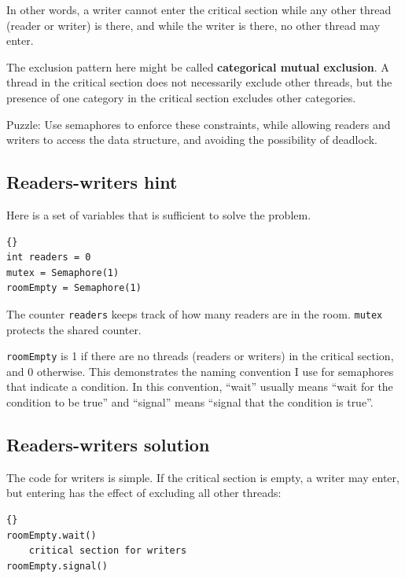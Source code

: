 \documentclass{book}
\begin{document}
In other words, a writer cannot enter the critical section while
any other thread (reader or writer) is there, and while the writer
is there, no other thread may enter.

The exclusion pattern here might be called {\bf categorical
        mutual exclusion}.  A thread in the critical section
does not necessarily exclude other threads, but the presence
of one category in the critical section excludes other
categories.

Puzzle: Use semaphores to enforce these constraints, while allowing
readers and writers to access the data structure, and avoiding
the possibility of deadlock.



\subsection{Readers-writers hint}

Here is a set of variables that is sufficient to solve the
problem.

\newpage
\begin{lstlisting}[title={Readers-writers initialization}]{}
int readers = 0
mutex = Semaphore(1)
roomEmpty = Semaphore(1)
\end{lstlisting}

The counter {\tt readers} keeps track of how many readers
are in the room.  {\tt mutex} protects the shared counter.

    {\tt roomEmpty} is 1 if there are no threads (readers or writers) in
the critical section, and 0 otherwise.  This demonstrates the naming
convention I use for semaphores that indicate a condition.  In
this convention, ``wait'' usually means ``wait for the condition to
be true'' and ``signal'' means ``signal that the condition is true''.



\subsection {Readers-writers solution}

The code for writers is simple.  If the critical section
is empty, a writer may enter, but entering has the effect
of excluding all other threads:

\begin{lstlisting}[title={Writers solution}]{}
roomEmpty.wait()
    critical section for writers
roomEmpty.signal()
\end{lstlisting}
\end{document}
